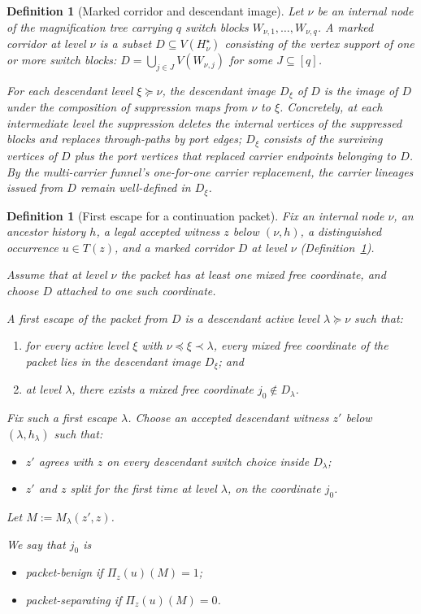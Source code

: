 \documentclass[11pt]{article}
\newtheorem{definition}[theorem]{Definition}
\begin{document}
\begin{definition}[Marked corridor and descendant image]
\label{def:marked-corridor}
Let $\nu$ be an internal node of the magnification tree carrying $q$
switch blocks $W_{\nu,1}, \ldots, W_{\nu,q}$.  A \emph{marked corridor}
at level $\nu$ is a subset $D \subseteq V(H^\star_\nu)$ consisting of
the vertex support of one or more switch blocks: $D = \bigcup_{j \in J}
V(W_{\nu,j})$ for some $J \subseteq [q]$.

For each descendant level $\xi \succeq \nu$, the \emph{descendant image}
$D_\xi$ of $D$ is the image of $D$ under the composition of suppression
maps from $\nu$ to $\xi$.  Concretely, at each intermediate level the
suppression deletes the internal vertices of the suppressed blocks and
replaces through-paths by port edges; $D_\xi$ consists of the surviving
vertices of $D$ plus the port vertices that replaced carrier endpoints
belonging to $D$.  By the multi-carrier funnel's one-for-one carrier
replacement, the carrier lineages issued from $D$ remain well-defined
in $D_\xi$.
\end{definition}

\begin{definition}[First escape for a continuation packet]
\label{def:first-escape}
Fix an internal node $\nu$, an ancestor history $h$, a legal accepted
witness $z$ below $(\nu,h)$, a distinguished occurrence $u\in T(z)$, and
a marked corridor $D$ at level $\nu$
(Definition~\ref{def:marked-corridor}).

Assume that at level $\nu$ the packet has at least one mixed free
coordinate, and choose $D$ attached to one such
coordinate.

A \emph{first escape} of the packet from $D$ is a descendant active
level $\lambda\succeq\nu$ such that:
\begin{enumerate}
\item for every active level $\xi$ with $\nu\preceq\xi\prec\lambda$,
  every mixed free coordinate of the packet lies in the descendant
  image $D_\xi$; and
\item at level $\lambda$, there exists a mixed free coordinate
  $j_0\notin D_\lambda$.
\end{enumerate}

Fix such a first escape $\lambda$.  Choose an accepted descendant witness
$z'$ below $(\lambda,h_\lambda)$ such that:
\begin{itemize}
\item $z'$ agrees with $z$ on every descendant switch choice inside
  $D_\lambda$;
\item $z'$ and $z$ split for the first time at level $\lambda$, on the
  coordinate $j_0$.
\end{itemize}

Let $M:=M_\lambda(z',z)$.

We say that $j_0$ is
\begin{itemize}
\item \emph{packet-benign} if $\Pi_z(u)(M)=1$;
\item \emph{packet-separating} if $\Pi_z(u)(M)=0$.
\end{itemize}
\end{definition}
\end{document}
